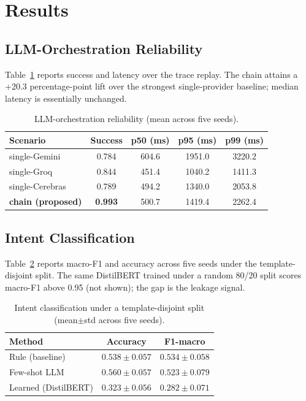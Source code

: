 \documentclass[conference]{IEEEtran}
\begin{document}
\section{Results}\label{sec:results}

\subsection{LLM-Orchestration Reliability}
Table~\ref{tab:reliability} reports success and latency over the
trace replay. The chain attains a +20.3 percentage-point lift over
the strongest single-provider baseline; median latency is essentially
unchanged.

\begin{table}[H]
\caption{LLM-orchestration reliability (mean across five seeds).}
\label{tab:reliability}
\centering
\footnotesize
\setlength{\tabcolsep}{4pt}
\begin{tabular}{l c c c c}
\toprule
Scenario & Success & p50 (ms) & p95 (ms) & p99 (ms) \\
\midrule
single-Gemini   & 0.784 & 604.6  & 1951.0 & 3220.2 \\
single-Groq     & 0.844 & 451.4  & 1040.2 & 1411.3 \\
single-Cerebras & 0.789 & 494.2  & 1340.0 & 2053.8 \\
\textbf{chain (proposed)} & \textbf{0.993} & 500.7 & 1419.4 & 2262.4 \\
\bottomrule
\end{tabular}
\end{table}

\subsection{Intent Classification}
Table~\ref{tab:intent} reports macro-F1 and accuracy across five
seeds under the template-disjoint split. The same DistilBERT trained
under a random 80/20 split scores macro-F1 above 0.95 (not shown);
the gap is the leakage signal.

\begin{table}[H]
\caption{Intent classification under a template-disjoint split
(mean$\pm$std across five seeds).}
\label{tab:intent}
\centering
\footnotesize
\setlength{\tabcolsep}{4pt}
\begin{tabular}{l c c}
\toprule
Method & Accuracy & F1-macro \\
\midrule
Rule (baseline)            & $0.538\pm0.057$ & $0.534\pm0.058$ \\
Few-shot LLM               & $0.560\pm0.057$ & $0.523\pm0.079$ \\
Learned (DistilBERT)       & $0.323\pm0.056$ & $0.282\pm0.071$ \\
\bottomrule
\end{tabular}
\end{table}
\end{document}
